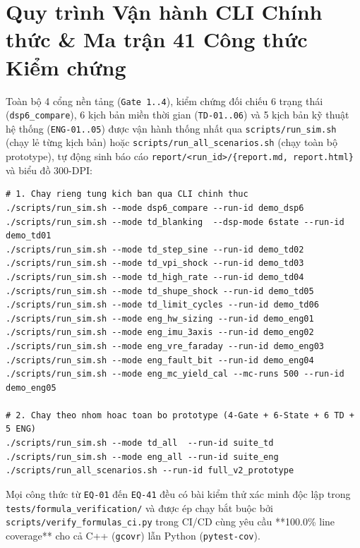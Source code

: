 \documentclass[11pt, a4paper]{article}
\begin{document}
\section{Quy trình Vận hành CLI Chính thức \& Ma trận 41 Công thức Kiểm chứng}

Toàn bộ 4 cổng nền tảng (\texttt{Gate 1..4}), kiểm chứng đối chiếu 6 trạng thái (\texttt{dsp6\_compare}), 6 kịch bản miền thời gian (\texttt{TD-01..06}) và 5 kịch bản kỹ thuật hệ thống (\texttt{ENG-01..05}) được vận hành thống nhất qua \texttt{scripts/run\_sim.sh} (chạy lẻ từng kịch bản) hoặc \texttt{scripts/run\_all\_scenarios.sh} (chạy toàn bộ prototype), tự động sinh báo cáo \texttt{report/<run\_id>/\{report.md, report.html\}} và biểu đồ 300-DPI:

\begin{footnotesize}
\begin{verbatim}
# 1. Chay rieng tung kich ban qua CLI chinh thuc
./scripts/run_sim.sh --mode dsp6_compare --run-id demo_dsp6
./scripts/run_sim.sh --mode td_blanking  --dsp-mode 6state --run-id demo_td01
./scripts/run_sim.sh --mode td_step_sine --run-id demo_td02
./scripts/run_sim.sh --mode td_vpi_shock --run-id demo_td03
./scripts/run_sim.sh --mode td_high_rate --run-id demo_td04
./scripts/run_sim.sh --mode td_shupe_shock --run-id demo_td05
./scripts/run_sim.sh --mode td_limit_cycles --run-id demo_td06
./scripts/run_sim.sh --mode eng_hw_sizing --run-id demo_eng01
./scripts/run_sim.sh --mode eng_imu_3axis --run-id demo_eng02
./scripts/run_sim.sh --mode eng_vre_faraday --run-id demo_eng03
./scripts/run_sim.sh --mode eng_fault_bit --run-id demo_eng04
./scripts/run_sim.sh --mode eng_mc_yield_cal --mc-runs 500 --run-id demo_eng05

# 2. Chay theo nhom hoac toan bo prototype (4-Gate + 6-State + 6 TD + 5 ENG)
./scripts/run_sim.sh --mode td_all  --run-id suite_td
./scripts/run_sim.sh --mode eng_all --run-id suite_eng
./scripts/run_all_scenarios.sh --run-id full_v2_prototype
\end{verbatim}
\end{footnotesize}

Mọi công thức từ \texttt{EQ-01} đến \texttt{EQ-41} đều có bài kiểm thử xác minh độc lập trong \texttt{tests/formula\_verification/} và được ép chạy bắt buộc bởi \texttt{scripts/verify\_formulas\_ci.py} trong CI/CD cùng yêu cầu **100.0\% line coverage** cho cả C++ (\texttt{gcovr}) lẫn Python (\texttt{pytest-cov}).
\end{document}

